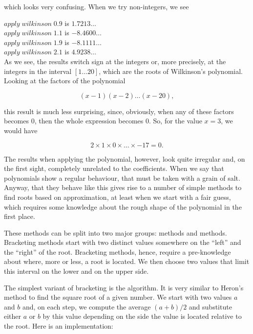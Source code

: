 \documentclass[tikz]{scrreprt}
\newcommand{\Varid}[1]{\mathit{#1}}
\begin{document}
which looks very confusing. When we try non-integers, we see

\ensuremath{\Varid{apply}\;\Varid{wilkinson}\;\mathrm{0.9}} is $1.7213\dots$\\
\ensuremath{\Varid{apply}\;\Varid{wilkinson}\;\mathrm{1.1}} is $-8.4600\dots$\\
\ensuremath{\Varid{apply}\;\Varid{wilkinson}\;\mathrm{1.9}} is $-8.1111\dots$\\
\ensuremath{\Varid{apply}\;\Varid{wilkinson}\;\mathrm{2.1}} is $4.9238\dots$\\

As we see, the results switch sign at the integers or,
more precisely, at the integers in the interval $[1\dots 20]$,
which are the roots of Wilkinson's polynomial.
Looking at the factors of the polynomial

\[
(x-1)(x-2)\dots (x-20),
\]

this result is much less surprising, since, obviously,
when any of these factors becomes 0, then the whole
expression becomes 0. So, for the value $x=3$, we would have

\[
2 \times 1 \times 0 \times \dots \times -17 = 0.
\]

The results when applying the polynomial, however,
look quite irregular and, on the first sight,
completely unrelated to the coefficients.
When we say that polynomials show a regular behaviour,
that must be taken with a grain of salt.
Anyway, that they behave like this 
gives rise to a number of simple
methods to find roots based on approximation,
at least when we start with a fair guess,
which requires some knowledge about the rough shape
of the polynomial in the first place.

These methods can be split into two major groups:
 methods and  methods.
Bracketing methods start with two distinct values
somewhere on the ``left'' and the ``right'' of
the root. Bracketing methods, hence, require a
pre-knowledge about where, more or less, a root
is located. We then choose two values that limit
this interval on the lower and on the upper side.

The simplest variant of bracketing is the 
algorithm. It is very similar to Heron's method
to find the square root of a given number.
We start with two values $a$ and $b$ and, on each step,
we compute the average $(a+b)/2$ and substitute
either $a$ or $b$ by this value depending on the side
the value is located relative to the root.
Here is an implementation:
\end{document}
